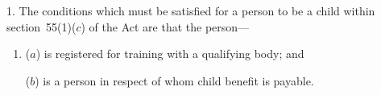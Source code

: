 \documentclass[a4paper,12pt]{article}
\begin{document}
%
%
%
%
%
%
%
%

1.  The conditions which must be satisfied for a person to be a child within section~55(1)($c$)  of the Act are that the person—
\begin{enumerate}\item[]
($a$) is registered for training with a qualifying body; and

($b$) is a person in respect of whom child benefit is payable.
\end{enumerate}
\end{document}

